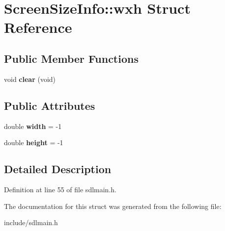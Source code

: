 \hypertarget{structScreenSizeInfo_1_1wxh}{\section{Screen\-Size\-Info\-:\-:wxh Struct Reference}
\label{structScreenSizeInfo_1_1wxh}
}
\subsection*{Public Member Functions}
\begin{DoxyCompactItemize}
\item 
\hypertarget{structScreenSizeInfo_1_1wxh_a1ddd72bce5ea48b234990d88be4e3ce1}{void {\bfseries clear} (void)}\label{structScreenSizeInfo_1_1wxh_a1ddd72bce5ea48b234990d88be4e3ce1}

\end{DoxyCompactItemize}
\subsection*{Public Attributes}
\begin{DoxyCompactItemize}
\item 
\hypertarget{structScreenSizeInfo_1_1wxh_a15263d1927c2d919edcf9cf3f3b60038}{double {\bfseries width} = -\/1}\label{structScreenSizeInfo_1_1wxh_a15263d1927c2d919edcf9cf3f3b60038}

\item 
\hypertarget{structScreenSizeInfo_1_1wxh_a615a741428eee20e8e9e07595354ce61}{double {\bfseries height} = -\/1}\label{structScreenSizeInfo_1_1wxh_a615a741428eee20e8e9e07595354ce61}

\end{DoxyCompactItemize}


\subsection{Detailed Description}


Definition at line 55 of file sdlmain.\-h.



The documentation for this struct was generated from the following file\-:\begin{DoxyCompactItemize}
\item 
include/sdlmain.\-h\end{DoxyCompactItemize}
